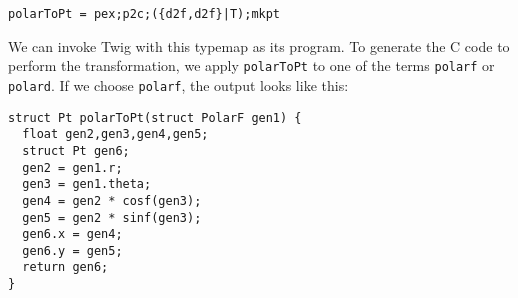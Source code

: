 \begin{verbatim}
polarToPt = pex;p2c;({d2f,d2f}|T);mkpt
\end{verbatim}

We can invoke Twig with this typemap as its program. To generate the C code to perform the transformation, we apply \texttt{polarToPt} to one of the terms \texttt{polarf} or \texttt{polard}. If we choose \texttt{polarf}, the output looks like this:

\begin{verbatim}
struct Pt polarToPt(struct PolarF gen1) {
  float gen2,gen3,gen4,gen5;
  struct Pt gen6;
  gen2 = gen1.r;
  gen3 = gen1.theta;
  gen4 = gen2 * cosf(gen3);
  gen5 = gen2 * sinf(gen3);
  gen6.x = gen4;
  gen6.y = gen5;
  return gen6;
}
\end{verbatim}
